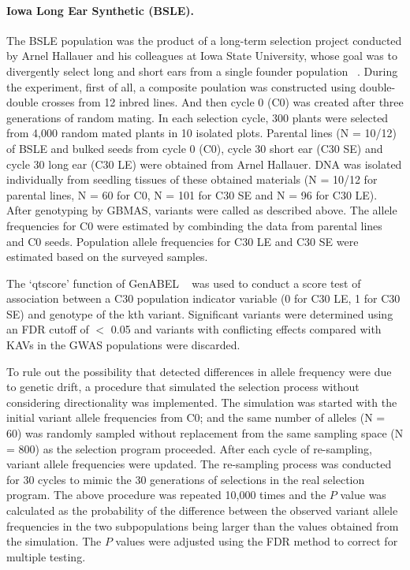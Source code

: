 \documentclass[10pt,letterpaper]{article}
\begin{document}
\paragraph{Iowa Long Ear Synthetic (BSLE).}
The BSLE population was the product of a long-term selection project conducted by Arnel Hallauer and his colleagues at Iowa State University, whose goal was to divergently select long and short ears from a single founder population ~\cite{Hallauer2004}. During the experiment, first of all, a composite poulation was constructed using double-double crosses from 12 inbred lines. And then cycle 0 (C0) was created after three generations of random mating. In each selection cycle, 300 plants were selected from 4,000 random mated plants in 10 isolated plots. Parental lines (N = 10/12) of BSLE and bulked seeds from cycle 0 (C0), cycle 30 short ear (C30 SE) and cycle 30 long ear (C30 LE) were obtained from Arnel Hallauer. DNA was isolated individually from seedling tissues of these obtained materials (N = 10/12 for parental lines, N = 60 for C0, N = 101 for C30 SE and N = 96 for C30 LE). After genotyping by GBMAS, variants were called as described above. The allele frequencies for C0 were estimated by combinding the data from parental lines and C0 seeds. Population allele frequencies for C30 LE and C30 SE were estimated based on the surveyed samples. 

The ‘qtscore’ function of GenABEL ~\cite{Aulchenko2007} was used to conduct a score test of association between a C30 population indicator variable (0 for C30 LE, 1 for C30 SE) and genotype of the kth variant. Significant variants were determined using an FDR cutoff of $<$ 0.05 and variants with conflicting effects compared with KAVs in the GWAS populations were discarded.

To rule out the possibility that detected differences in allele frequency were due to genetic drift, a procedure that simulated the selection process without considering directionality was implemented. The simulation was started with the initial variant allele frequencies from C0; and the same number of alleles (N = 60) was randomly sampled without replacement from the same sampling space (N = 800) as the selection program proceeded. After each cycle of re-sampling, variant allele frequencies were updated. The re-sampling process was conducted for 30 cycles to mimic the 30 generations of selections in the real selection program. The above procedure was repeated 10,000 times and the $P$ value was calculated as the probability of the difference between the observed variant allele frequencies in the two subpopulations being larger than the values obtained from the simulation. The $P$ values were adjusted using the FDR method to correct for multiple testing. 
\end{document}

